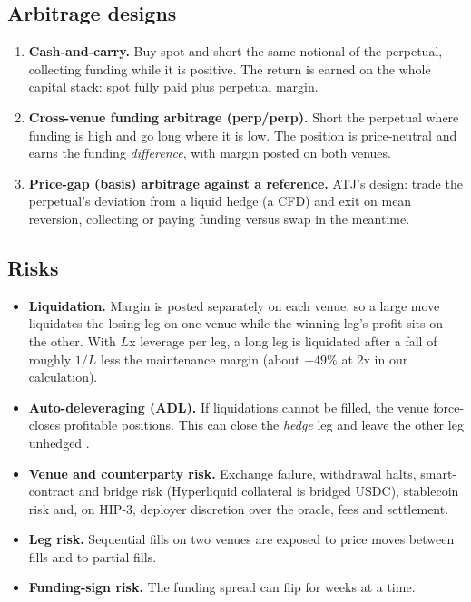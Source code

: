\documentclass[11pt,a4paper]{article}
\begin{document}
\subsection{Arbitrage designs}
\begin{enumerate}[label=(\roman*)]
\item \textbf{Cash-and-carry.} Buy spot and short the same notional of the perpetual, collecting funding while it is positive. The return is earned on the whole capital stack: spot fully paid plus perpetual margin.
\item \textbf{Cross-venue funding arbitrage (perp/perp).} Short the perpetual where funding is high and go long where it is low. The position is price-neutral and earns the funding \emph{difference}, with margin posted on both venues.
\item \textbf{Price-gap (basis) arbitrage against a reference.} ATJ's design: trade the perpetual's deviation from a liquid hedge (a CFD) and exit on mean reversion, collecting or paying funding versus swap in the meantime.
\end{enumerate}

\subsection{Risks}
\begin{itemize}
\item \textbf{Liquidation.} Margin is posted separately on each venue, so a large move liquidates the losing leg on one venue while the winning leg's profit sits on the other. With $L$x leverage per leg, a long leg is liquidated after a fall of roughly $1/L$ less the maintenance margin (about $-49\%$ at 2x in our calculation).
\item \textbf{Auto-deleveraging (ADL).} If liquidations cannot be filled, the venue force-closes profitable positions. This can close the \emph{hedge} leg and leave the other leg unhedged \citep{chitra2025adl}.
\item \textbf{Venue and counterparty risk.} Exchange failure, withdrawal halts, smart-contract and bridge risk (Hyperliquid collateral is bridged USDC), stablecoin risk and, on HIP-3, deployer discretion over the oracle, fees and settlement.
\item \textbf{Leg risk.} Sequential fills on two venues are exposed to price moves between fills and to partial fills.
\item \textbf{Funding-sign risk.} The funding spread can flip for weeks at a time.
\end{itemize}
\end{document}
